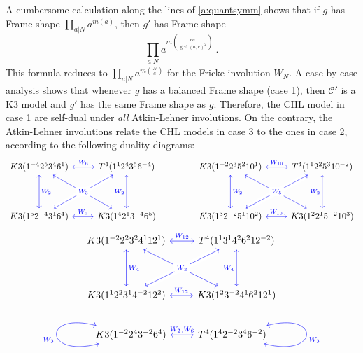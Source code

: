 \documentclass[a4paper,11pt]{article}
\newcommand{\ZZ}{\mathbb{Z}}
\newcommand{\C}{\mathcal{C}}
\numberwithin{equation}{section}
\def\be{\begin{equation}}
\def\ee{\end{equation}}
\begin{document}
\medskip

A cumbersome calculation along the lines of \ref{a:quantsymm} shows that if $g$ has Frame shape $\prod_{a|N}a^{m(a)}$, then $g'$ has Frame shape
\be \prod_{a|N} a^{m(\frac{ea}{\gcd(a,e)^2})}\ .
\ee This formula reduces to $\prod_{a|N} a^{m(\frac{N}{a})}$ for the Fricke involution $W_N$. A case by case analysis shows that whenever $g$ has a balanced Frame shape (case 1), then $\C'$ is a K3 model and $g'$ has the same Frame shape as $g$. Therefore, the CHL model in case 1 are self-dual under \emph{all} Atkin-Lehner involutions. On the contrary, the Atkin-Lehner involutions relate the CHL models in case $3$ to the ones in case 2, according to the following duality diagrams:
$$ \begin{tikzcd}
K3(1^{-4} 2^5 3^4 6^1) \color{red}{\arrow[leftrightarrow,color=blue]{r}{W_6}}\arrow[leftrightarrow,color=blue]{d}{W_2}\arrow[leftrightarrow,color=blue]{dr}[description]{W_3} & %
T^4(1^1 2^4 3^5 6^{-4})\\[20pt] 
K3(1^5 2^{-4} 3^1 6^4)\arrow[leftrightarrow,color=blue]{r}{W_6}\arrow[leftrightarrow,crossing over,color=blue]{ru}[description]{W_3} & K3(1^4 2^1 3^{-4} 6^5) \arrow[leftrightarrow,color=blue]{u}{W_2}
\end{tikzcd}
\qquad \qquad\begin{tikzcd}
K3(1^{-2} 2^3 5^2 10^1) \arrow[leftrightarrow,color=blue]{r}{W_{10}}\arrow[leftrightarrow,color=blue]{d}{W_2}\arrow[leftrightarrow,color=blue]{dr}[description]{W_5} & 
T^4(1^1 2^2 5^3 10^{-2})\\[20pt] 
K3(1^3 2^{-2} 5^1 10^2)\arrow[leftrightarrow,color=blue]{r}{W_{10}}\arrow[leftrightarrow,crossing over,color=blue]{ru}[description]{W_5} & K3(1^2 2^1 5^{-2} 10^3) \arrow[leftrightarrow,color=blue]{u}{W_2}
\end{tikzcd}
$$
$$ \begin{tikzcd}
K3(1^{-2} 2^2 3^2 4^1 12^1) \arrow[leftrightarrow,color=blue]{r}{W_{12}}\arrow[leftrightarrow,color=blue]{d}{W_4}\arrow[leftrightarrow,color=blue]{dr}[description]{W_3} & 
T^4(1^1  3^1 4^2 6^2 12^{-2})\\[20pt] 
K3(1^1 2^2 3^1 4^{-2} 12^2)\arrow[leftrightarrow,color=blue]{r}{W_{12}}\arrow[leftrightarrow,crossing over,color=blue]{ru}[description]{W_3} & K3(1^2 3^{-2} 4^1 6^2 12^1) \arrow[leftrightarrow,color=blue]{u}{W_4}
\end{tikzcd}
$$
$$ \begin{tikzcd}
K3(1^{-2} 2^4 3^{-2} 6^4) \arrow[leftrightarrow,color=blue]{r}{W_2,W_{6}}\arrow[leftrightarrow,loop left,color=blue]{}{W_3} & 
T^4(1^4 2^{-2} 3^4 6^{-2})\arrow[leftrightarrow,loop right,color=blue]{}{W_3}
\end{tikzcd}
$$
\end{document}
